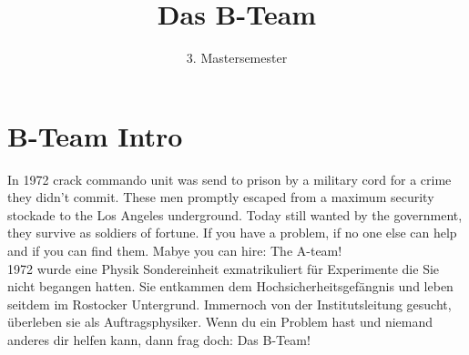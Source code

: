 \documentclass[10pt,a4paper]{article}
\title{Das B-Team}
\author{3. Mastersemester}
\begin{document}
\maketitle

\section{B-Team Intro}
In 1972 crack commando unit was send to prison by a military cord for a crime they didn’t commit. 
These men promptly escaped from a maximum security stockade to the Los Angeles underground. 
Today still wanted by the government, they survive as soldiers of fortune. 
If you have a problem, if no one else can help and if you can find them. Mabye you can hire: 
The A-team!\\
1972 wurde eine Physik Sondereinheit exmatrikuliert für Experimente die Sie nicht begangen hatten. 
Sie entkammen dem Hochsicherheitsgefängnis und leben seitdem im Rostocker Untergrund. 
Immernoch von der Institutsleitung gesucht, überleben sie als Auftragsphysiker.
Wenn du ein Problem hast und niemand anderes dir helfen kann, dann frag doch: 
Das B-Team!
\end{document}
